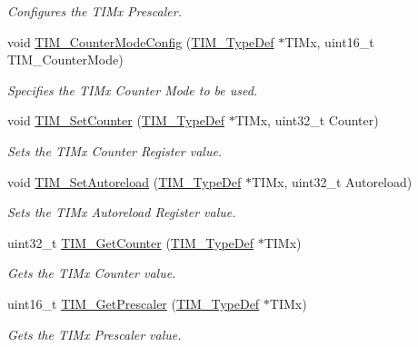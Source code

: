 \begin{DoxyCompactItemize}
\begin{DoxyCompactList}\small\item\em Configures the T\+I\+Mx Prescaler. \end{DoxyCompactList}\item 
void \hyperlink{group___t_i_m___group1_ga93941c1db20bf3794f377307df90a67b}{T\+I\+M\+\_\+\+Counter\+Mode\+Config} (\hyperlink{struct_t_i_m___type_def}{T\+I\+M\+\_\+\+Type\+Def} $\ast$T\+I\+Mx, uint16\+\_\+t T\+I\+M\+\_\+\+Counter\+Mode)
\begin{DoxyCompactList}\small\item\em Specifies the T\+I\+Mx Counter Mode to be used. \end{DoxyCompactList}\item 
void \hyperlink{group___t_i_m___group1_ga18173e7955a85d5c2598c643eada2692}{T\+I\+M\+\_\+\+Set\+Counter} (\hyperlink{struct_t_i_m___type_def}{T\+I\+M\+\_\+\+Type\+Def} $\ast$T\+I\+Mx, uint32\+\_\+t Counter)
\begin{DoxyCompactList}\small\item\em Sets the T\+I\+Mx Counter Register value. \end{DoxyCompactList}\item 
void \hyperlink{group___t_i_m___group1_gad6a388d498c7f299d00a9d0871943041}{T\+I\+M\+\_\+\+Set\+Autoreload} (\hyperlink{struct_t_i_m___type_def}{T\+I\+M\+\_\+\+Type\+Def} $\ast$T\+I\+Mx, uint32\+\_\+t Autoreload)
\begin{DoxyCompactList}\small\item\em Sets the T\+I\+Mx Autoreload Register value. \end{DoxyCompactList}\item 
uint32\+\_\+t \hyperlink{group___t_i_m___group1_ga53607976e0866ab424e294cda9f6036e}{T\+I\+M\+\_\+\+Get\+Counter} (\hyperlink{struct_t_i_m___type_def}{T\+I\+M\+\_\+\+Type\+Def} $\ast$T\+I\+Mx)
\begin{DoxyCompactList}\small\item\em Gets the T\+I\+Mx Counter value. \end{DoxyCompactList}\item 
uint16\+\_\+t \hyperlink{group___t_i_m___group1_ga427eb6e533480e02a27cd0ca876183d6}{T\+I\+M\+\_\+\+Get\+Prescaler} (\hyperlink{struct_t_i_m___type_def}{T\+I\+M\+\_\+\+Type\+Def} $\ast$T\+I\+Mx)
\begin{DoxyCompactList}\small\item\em Gets the T\+I\+Mx Prescaler value. \end{DoxyCompactList}\item 

\end{DoxyCompactItemize}
